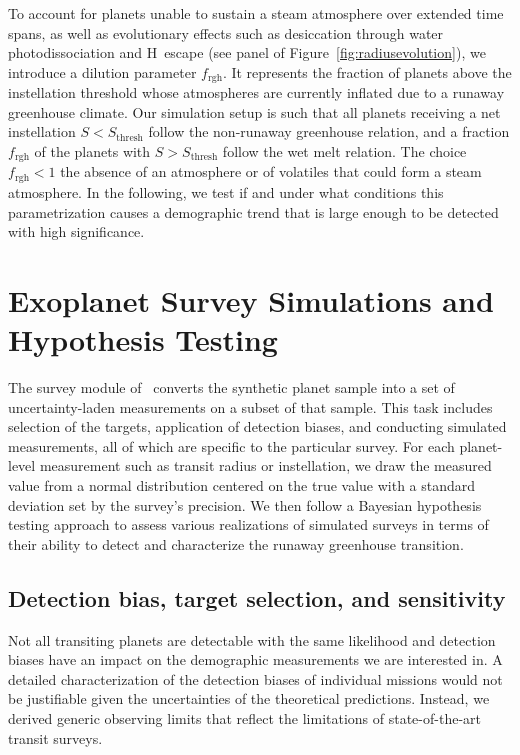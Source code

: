 \documentclass[twocolumn,twocolappendix,linenumbers]{aastex631}
\begin{document}
To account for planets unable to sustain a steam atmosphere over extended time spans, as well as evolutionary effects such as desiccation through water photodissociation and H~escape (see  panel of Figure~\ref{fig:radiusevolution}), we introduce a dilution parameter $f_\mathrm{rgh}$.
It represents the fraction of planets above the instellation threshold whose atmospheres are currently inflated due to a runaway greenhouse climate.
Our simulation setup is such that all planets receiving a net instellation $S < S_\mathrm{thresh}$ follow the non-runaway greenhouse relation, and a fraction $f_\mathrm{rgh}$ of the planets with $S > S_\mathrm{thresh}$ follow the wet melt relation.
The choice $f_\mathrm{rgh} < 1$ 
 the absence of an atmosphere or of volatiles that could form a steam atmosphere.
In the following, we test if and under what conditions this parametrization causes a demographic trend that is large enough to be detected with high significance.


\section{Exoplanet Survey Simulations and Hypothesis Testing}\label{sec:met_surveys-hypotests}
The survey module of \bioverse\ converts the synthetic planet sample into a set of uncertainty-laden measurements on a subset of that sample.
This task includes selection of the targets, application of detection biases, and conducting simulated measurements, all of which are specific to the particular survey.
For each planet-level measurement such as transit radius or instellation, we draw the measured value from a normal distribution centered on the true value with a standard deviation set by the survey's precision.
We then follow a Bayesian hypothesis testing approach to assess various realizations of simulated surveys in terms of their ability to detect and characterize the runaway greenhouse transition.

\subsection{Detection bias, target selection, and sensitivity}\label{sec:sensitivity} %
Not all transiting planets are detectable with the same likelihood and detection biases have an impact on the demographic measurements we are interested in.
A detailed characterization of the detection biases of individual missions would not be justifiable given the uncertainties of the theoretical predictions.
Instead, we derived generic observing limits that reflect the limitations of state-of-the-art transit surveys.
\end{document}
